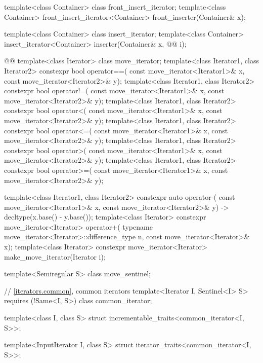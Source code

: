 \begin{codeblock}
  template<class Container> class front_insert_iterator;
  template<class Container>
    front_insert_iterator<Container> front_inserter(Container& x);

  template<class Container> class insert_iterator;
  template<class Container>
    insert_iterator<Container> inserter(Container& x, @@ i);

  @@
  template<class Iterator> class move_iterator;
  template<class Iterator1, class Iterator2>
    constexpr bool operator==(
      const move_iterator<Iterator1>& x, const move_iterator<Iterator2>& y);
  template<class Iterator1, class Iterator2>
    constexpr bool operator!=(
      const move_iterator<Iterator1>& x, const move_iterator<Iterator2>& y);
  template<class Iterator1, class Iterator2>
    constexpr bool operator<(
      const move_iterator<Iterator1>& x, const move_iterator<Iterator2>& y);
  template<class Iterator1, class Iterator2>
    constexpr bool operator<=(
      const move_iterator<Iterator1>& x, const move_iterator<Iterator2>& y);
  template<class Iterator1, class Iterator2>
    constexpr bool operator>(
      const move_iterator<Iterator1>& x, const move_iterator<Iterator2>& y);
  template<class Iterator1, class Iterator2>
    constexpr bool operator>=(
      const move_iterator<Iterator1>& x, const move_iterator<Iterator2>& y);

  template<class Iterator1, class Iterator2>
    constexpr auto operator-(
    const move_iterator<Iterator1>& x,
    const move_iterator<Iterator2>& y) -> decltype(x.base() - y.base());
  template<class Iterator>
    constexpr move_iterator<Iterator> operator+(
      typename move_iterator<Iterator>::difference_type n, const move_iterator<Iterator>& x);
  template<class Iterator>
    constexpr move_iterator<Iterator> make_move_iterator(Iterator i);

\end{codeblock}\begin{addedblock}\begin{codeblock}
  template<Semiregular S> class move_sentinel;

  // \ref{iterators.common}, common iterators
  template<Iterator I, Sentinel<I> S>
    requires (!Same<I, S>)
      class common_iterator;

  template<class I, class S>
    struct incrementable_traits<common_iterator<I, S>>;

  template<InputIterator I, class S>
    struct iterator_traits<common_iterator<I, S>>;


\end{codeblock}
\end{addedblock}
